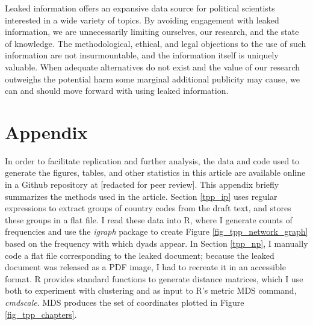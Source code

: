 \documentclass[12pt]{article}
\begin{document}
Leaked information offers an expansive data source for political scientists interested in a wide variety of topics. 
By avoiding engagement with leaked information, we are unnecessarily limiting ourselves, our research, and 
the state of knowledge. The methodological, ethical, and legal objections to the use of such information 
are not insurmountable, and the information itself is uniquely valuable. When adequate alternatives 
do not exist and the value of our research outweighs the potential harm some marginal additional publicity may cause, 
we can and should move forward with using leaked information.


\section{Appendix}

In order to facilitate replication and further analysis, the data and code used to 
generate the figures, tables, and other statistics in this article are available online 
in a Github repository at [redacted for peer review]. This appendix briefly summarizes the methods used in the 
article. Section \ref{tpp_ip} uses regular expressions to extract groups of country 
codes from the draft text, and stores these groups in a flat file. I read these data 
into R, where I generate counts of frequencies and use the \emph{igraph} package to 
create Figure \ref{fig_tpp_network_graph} based on the frequency with which dyads appear. 
In Section \ref{tpp_np}, I manually code a flat file corresponding 
to the leaked document; because the leaked document was released as a PDF image, I had to recreate 
it in an accessible format. R provides standard functions to generate distance matrices, 
which I use both to experiment with clustering and as input to R's metric MDS 
command, \emph{cmdscale}. MDS produces the set of coordinates plotted in Figure \ref{fig_tpp_chapters}.

\theendnotes



\end{document}
